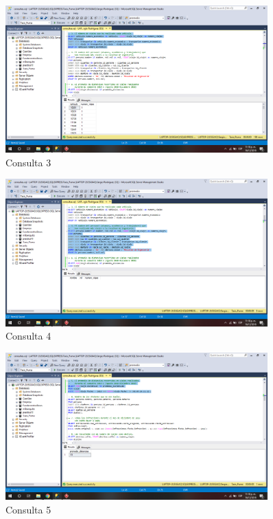 \documentclass{article}
\begin{document}
\begin{figure}[h]
            \centering
            \includegraphics[width=0.9\textwidth]{img/55.png}
            \caption{Consulta 3}
            \label{fig:my_label3}
        \end{figure}

\begin{figure}[h]
            \centering
            \includegraphics[width=0.9\textwidth]{img/56.png}
            \caption{Consulta 4}
            \label{fig:my_label4}
        \end{figure}

\begin{figure}[h]
            \centering
            \includegraphics[width=0.9\textwidth]{img/57.png}
            \caption{Consulta 5}
            \label{fig:my_label5}
        \end{figure}
        
\end{document}
